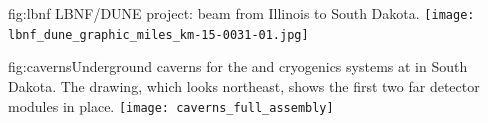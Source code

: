 

\begin{dunefigure}{fig:lbnf}{ 	
LBNF/DUNE project: beam from Illinois to South Dakota.}
\texttt{[image: lbnf\_dune\_graphic\_miles\_km-15-0031-01.jpg]}
\end{dunefigure}

\begin{dunefigure}{fig:caverns}{Underground caverns for the   and cryogenics systems at  in South Dakota. The drawing, which looks northeast, shows the first two far detector modules in place.}
\texttt{[image: caverns\_full\_assembly]}
\end{dunefigure}



